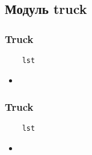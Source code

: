 \subsection{Модуль truck}

\subsubsection{Truck}

\begin{lstlisting}
    lst
\end{lstlisting}

\begin{itemize}
    \item \verb||
\end{itemize}

\subsubsection{Truck}

\begin{lstlisting}
    lst
\end{lstlisting}

\begin{itemize}
    \item \verb||
\end{itemize}

